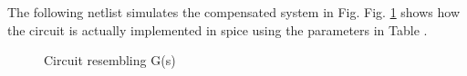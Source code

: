 \begin{enumerate}[label=\arabic*.,ref=\theenumi]
The following netlist simulates the compensated system in Fig. 
Fig. \ref{fig:ee18btech110026_circuit_2} shows how the circuit is actually implemented in spice using the parameters in Table \label{table:ee18btech11026_Table_3}.  

\begin{figure}[!ht]
	\begin{center}
				\resizebox{\columnwidth}{!}{}
	\end{center}
\caption{Circuit resembling G(s)}
\label{fig:ee18btech110026_circuit_2}
\end{figure}

\begin{table}[!ht]
\centering

\caption{}
\label{table:ee18btech11026_Table_3}
\end{table}
\end{enumerate}

